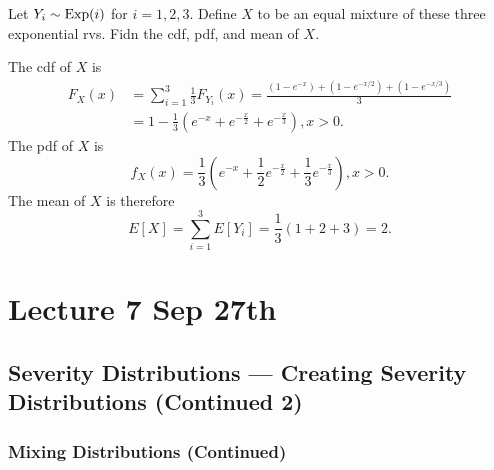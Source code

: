 \documentclass[notoc,notitlepage]{tufte-book}
\begin{document}
\begin{eg}
  Let $Y_i \sim \operatorname{Exp}(i)$ for $i = 1, 2, 3$. Define $X$ to be an equal mixture of these three exponential rvs. Fidn the cdf, pdf, and mean of $X$.
\end{eg}

\begin{solution}
  The cdf of $X$ is
  \begin{align*}
    F_X(x) &= \sum_{i=1}^{3} \frac{1}{3}F_{Y_i}(x) = \frac{(1 - e^{-x}) + (1 - e^{- x / 2}) + (1 - e^{-x / 3})}{3} \\
           &= 1 - \frac{1}{3} \left( e^{-x} + e^{-\frac{x}{2}} + e^{-\frac{x}{3}} \right), x > 0.
  \end{align*}
  The pdf of $X$ is
  \begin{equation*}
    f_X(x) = \frac{1}{3} \left( e^{-x} + \frac{1}{2} e^{-\frac{x}{2}} + \frac{1}{3} e^{-\frac{x}{3}} \right), x > 0.
  \end{equation*}
  The mean of $X$ is therefore
  \begin{equation*}
    E[X] = \sum_{i=1}^{3} E[ Y_i ] = \frac{1}{3} ( 1 + 2 + 3 ) = 2.
  \end{equation*}
\end{solution}




\chapter{Lecture 7 Sep 27th}%
\label{chp:lecture_7_sep_27th}

\section{Severity Distributions --- Creating Severity Distributions (Continued 2)}%
\label{sec:severity_distributions_creating_severity_distributions_continued_2}

\subsection{Mixing Distributions (Continued)}%
\label{sub:mixing_distributions_continued}
\end{document}
